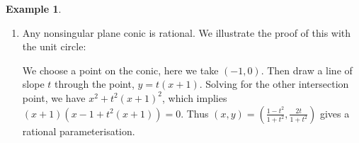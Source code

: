 \documentclass[11pt]{article}
\theoremstyle{definition}
\newtheorem{example}[definition]{Example}
\theoremstyle{plain}
\theoremstyle{remark}
\begin{document}
\begin{example}\label{eg:2_2}\phantom{}
    \begin{enumerate}[label=(\alph*)]
        \item Any nonsingular plane conic is rational. We illustrate the proof of this with the unit circle:
            \begin{figure}[H]
            \centering
            \end{figure}
            We choose a point on the conic, here we take $(-1, 0)$. Then draw a line of slope $t$ through the point, $y = t(x+1)$. Solving for the other intersection point, we have $x^2 + t^2 (x+1)^2$, which implies $(x+1)(x-1+t^2(x+1)) = 0$. Thus $(x, y) = (\frac{1-t^2}{1+t^2}, \frac{2t}{1+t^2})$ gives a rational parameterisation.


\end{enumerate}
\end{example}
\end{document}

